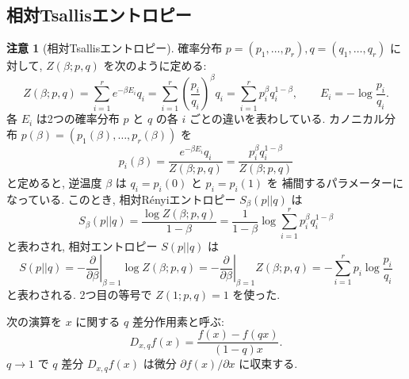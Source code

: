 \documentclass[12pt,twoside]{jarticle}
\renewcommand\d{\partial}
\theoremstyle{definition} %
\theoremstyle{definition} %
\theoremstyle{definition} %
\newtheorem{remark}[theorem]{注意}
\numberwithin{theorem}{section}
\numberwithin{equation}{section}
\numberwithin{figure}{section}
\numberwithin{table}{section}
\begin{document}

\subsection{相対Tsallisエントロピー}
\label{sec:Tsallis}

\begin{remark}[相対Tsallisエントロピー]
\label{remark:Tsallis}
確率分布 $p=(p_1,\ldots,p_r),q=(q_1,\ldots,q_r)$ に対して, 
$Z(\beta;p,q)$ を次のように定める:
\[
Z(\beta;p,q) 
= \sum_{i=1}^r e^{-\beta E_i} q_i
= \sum_{i=1}^r \left(\frac{p_i}{q_i}\right)^\beta q_i
= \sum_{i=1}^r p_i^\beta q_i^{1-\beta},
\qquad
E_i = -\log\frac{p_i}{q_i}.
\]
各 $E_i$ は2つの確率分布 $p$ と $q$ の各 $i$ ごとの違いを表わしている.
カノニカル分布 $p(\beta)=(p_1(\beta),\ldots,p_r(\beta))$ を
\[
p_i(\beta)
=\frac{e^{-\beta E_i}q_i}{Z(\beta;p,q)}
=\frac{p_i^\beta q_i^{1-\beta}}{Z(\beta;p,q)}
\]
と定めると, 逆温度 $\beta$ は $q_i=p_i(0)$ と $p_i=p_i(1)$ を
補間するパラメーターになっている.
このとき, 相対R\'enyiエントロピー $S_\beta(p||q)$ は
\[
S_\beta(p||q)
=\frac{\log Z(\beta;p,q)}{1-\beta}
=\frac{1}{1-\beta}\log\sum_{i=1}^r p_i^\beta q_i^{1-\beta}
\]
と表わされ, 相対エントロピー $S(p||q)$ は 
\[
S(p||q)
=-\left.\frac{\d}{\d\beta}\right|_{\beta=1} \log Z(\beta;p,q) 
=-\left.\frac{\d}{\d\beta}\right|_{\beta=1} Z(\beta;p,q) 
=-\sum_{i=1}^r p_i\log\frac{p_i}{q_i}
\]
と表わされる. 2つ目の等号で $Z(1;p,q)=1$ を使った.

次の演算を $x$ に関する $q$ 差分作用素と呼ぶ:
\[
D_{x,q}f(x) = \frac{f(x)-f(qx)}{(1-q)x}.
\]
$q\to 1$ で $q$ 差分 $D_{x,q}f(x)$ は微分 $\d f(x)/\d x$ に収束する.


\end{remark}
\end{document}
